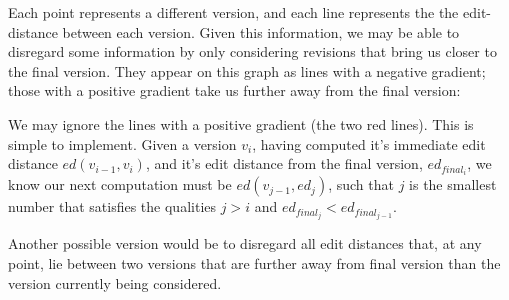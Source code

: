 \documentclass[a4paper,11pt,twoside,notitlepage]{article}
\begin{document}
        Each point represents a different version, and each line
        represents the the edit-distance between each version. Given
        this information, we may be able to disregard some information
        by only considering revisions that bring us closer to the
        final version. They appear on this graph as lines with a
        negative gradient; those with a positive gradient take us
        further away from the final version:

          \begin{center}
          \pgfplotsset{width=0.4\textwidth}
          \end{center}

        We may ignore the lines with a positive gradient (the two
        red lines). This is simple to implement. Given a version
        $v_i$, having computed it's immediate edit distance
        $ed(v_{i-1},v_i)$, and it's edit distance from the final
        version, $ed_{final_i}$, we know our next computation must be
        $ed(v_{j-1},ed_j)$, such that $j$ is the smallest number that
        satisfies the qualities $j > i$ and $ed_{final_j} <
        ed_{final_{j-1}}$. 

        Another possible version would be to disregard all edit
        distances that, at any point, lie between two versions that
        are further away from final version than the version
        currently being considered.

          \begin{center}
          \pgfplotsset{width=0.4\textwidth}
          \end{center}
        
\end{document}

